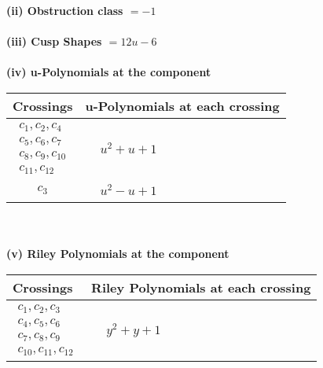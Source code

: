 \documentclass[1p]{elsarticle_modified}
\theoremstyle{definition}
\begin{document}
\flushleft \textbf{(ii) Obstruction class $= -1$}\\~\\
\flushleft \textbf{(iii) Cusp Shapes $= 12 u-6$}\\~\\
\newpage\renewcommand{\arraystretch}{1}
\flushleft \textbf{(iv) u-Polynomials at the component}\newline \\
\begin{tabular}{m{50pt}|m{274pt}}
Crossings & \hspace{64pt}u-Polynomials at each crossing \\
\hline $$\begin{aligned}c_{1},c_{2},c_{4}\\c_{5},c_{6},c_{7}\\c_{8},c_{9},c_{10}\\c_{11},c_{12}\end{aligned}$$&$\begin{aligned}
&u^2+u+1
\end{aligned}$\\
\hline $$\begin{aligned}c_{3}\end{aligned}$$&$\begin{aligned}
&u^2- u+1
\end{aligned}$\\
\hline
\end{tabular}\\~\\
\newpage\renewcommand{\arraystretch}{1}
\flushleft \textbf{(v) Riley Polynomials at the component}\newline \\
\begin{tabular}{m{50pt}|m{274pt}}
Crossings & \hspace{64pt}Riley Polynomials at each crossing \\
\hline $$\begin{aligned}c_{1},c_{2},c_{3}\\c_{4},c_{5},c_{6}\\c_{7},c_{8},c_{9}\\c_{10},c_{11},c_{12}\end{aligned}$$&$\begin{aligned}
&y^2+y+1
\end{aligned}$\\
\hline
\end{tabular}\\~\\
\end{document}
